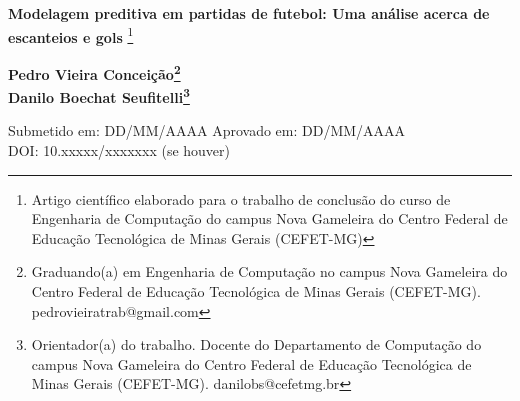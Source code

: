 \begin{center}
    {\bfseries\Large Modelagem preditiva em partidas de futebol: Uma análise acerca de escanteios e gols }\footnote{Artigo científico elaborado para o trabalho de conclusão do curso de Engenharia de Computação do campus Nova Gameleira do Centro Federal de Educação Tecnológica de Minas Gerais (CEFET-MG)}
\end{center}

\vspace{\onelineskip}


\begin{center}
    \bfseries Pedro Vieira Conceição\footnote{Graduando(a) em Engenharia de Computação no campus Nova Gameleira do Centro Federal de Educação Tecnológica de Minas Gerais (CEFET-MG). pedrovieiratrab@gmail.com} \\
    \bfseries Danilo Boechat Seufitelli\footnote{Orientador(a) do trabalho. Docente do Departamento de Computação do campus Nova Gameleira do Centro Federal de Educação Tecnológica de Minas Gerais (CEFET-MG). danilobs@cefetmg.br}
\end{center}

\begin{center}
\small
Submetido em: DD/MM/AAAA \quad\textbar\quad Aprovado em: DD/MM/AAAA \\
DOI: 10.xxxxx/xxxxxxx \hspace{1em} (se houver)
\end{center}

